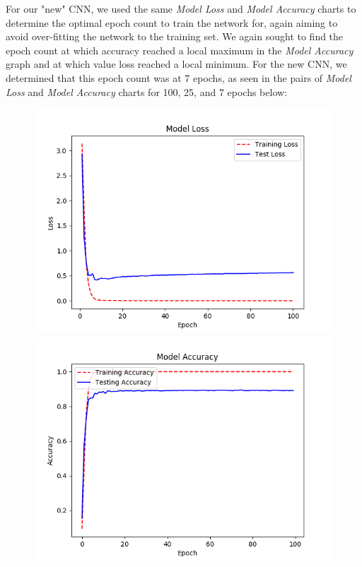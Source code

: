 \documentclass[11pt]{article}
\begin{document}
For our "new" CNN, we used the same \textit{Model Loss} and \textit{Model Accuracy} charts to determine the optimal epoch count to train the network for, again aiming to avoid over-fitting the network to the training set. We again sought to find the epoch count at which accuracy reached a local maximum in the \textit{Model Accuracy} graph and at which value loss reached a local minimum. For the new CNN, we determined that this epoch count was at 7 epochs, as seen in the pairs of \textit{Model Loss} and \textit{Model Accuracy} charts for 100, 25, and 7 epochs below:

\begin{figure}[H]
\begin{center}
    \includegraphics[scale=0.5]{images/NewModelLoss100Epochs.png}
    \includegraphics[scale = 0.5]{images/NewModelAccuracy100Epochs.png}

\end{center}
\end{figure}
\end{document}
